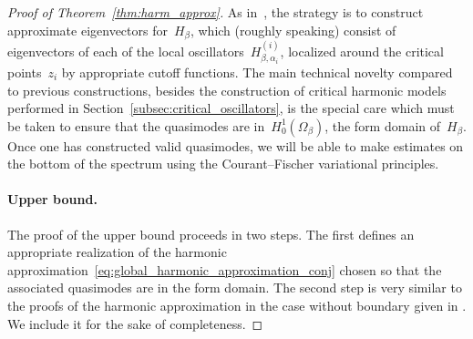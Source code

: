 \documentclass[10pt]{article}
\newcommand{\1}{\mathbbm 1}
\begin{document}
    \begin{proof}[Proof of Theorem~\ref{thm:harm_approx}]
        As in~\cite{S83}, the strategy is to construct approximate eigenvectors for~$H_\beta$, which (roughly speaking) consist of eigenvectors of each of the local oscillators~$H_{\beta,\alpha_i}^{(i)}$, localized around the critical points~$z_i$ by appropriate cutoff functions.
        The main technical novelty compared to previous constructions, besides the construction of critical harmonic models performed in Section~\ref{subsec:critical_oscillators}, is the special care which must be taken to ensure that the quasimodes are in~$H_0^1(\Omega_\beta)$, the form domain of~$H_\beta$. Once one has constructed valid quasimodes, we will be able to make estimates on the bottom of the spectrum using the Courant--Fischer variational principles.

        \paragraph{Upper bound.}
        The proof of the upper bound proceeds in two steps. The first defines an appropriate realization of the harmonic approximation~\eqref{eq:global_harmonic_approximation_conj} chosen so that the associated quasimodes are in the form domain. The second step is very similar to the proofs of the harmonic approximation in the case without boundary given in \cite{S83,CFKS87}. We include it for the sake of completeness.  


\end{proof}
\end{document}
